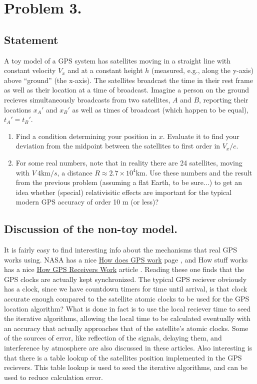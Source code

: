 \section{Problem 3.}
\subsection{Statement}

A toy model of a GPS system has satellites moving in a straight line with constant velocity $V_x$ and at a constant height $h$ (measured, e.g., along the y-axis) above ``ground'' (the x-axis).  The satellites broadcast the time in their rest frame as well as their location at a time of broadcast.  Imagine a person on the ground recieves simultaneously broadcasts from two satellites, $A$ and $B$, reporting their locations $x_A'$ and $x_B'$ as well as times of broadcast (which happen to be equal), $t_A' = t_B'$.	

\begin{enumerate}
\item  Find a condition determining your position in $x$.  Evaluate it to find your deviation from the midpoint between the satellites to first order in $V_x/c$.
\item For some real numbers, note that in reality there are 24 satellites, moving with $V ~4 \text{km}/s$, a distance $R \approx 2.7 \times 10^4 \text{km}$.  Use these numbers and the result from the previous problem (assuming a flat Earth, to be sure...) to get an idea whether (special) relativisitic effects are important for the typical modern GPS accuracy of order 10 m (or less)?
\end{enumerate}

\subsection{Discussion of the non-toy model.}

It is fairly easy to find interesting info about the mechanisms that real GPS works using.  NASA has a nice \href{http://www.nasm.si.edu/gps/work.html}{How does GPS work} page \cite{nasaGPS}, and How stuff works has a nice \href{http://electronics.howstuffworks.com/gadgets/travel/gps.htm}{How GPS Receivers Work} article \cite{howStuffWorksGPS}.  Reading these one finds that the GPS clocks are actually kept synchronized.  The typical GPS reciever obviously has a clock, since we have countdown timers for time until arrival, is that clock accurate enough compared to the satellite atomic clocks to be used for the GPS location algorithm?  What is done in fact is to use the local reciever time to seed the iterative algorithms, allowing the local time to be calculated eventually with an accuracy that actually approaches that of the satellite's atomic clocks.  Some of the sources of error, like reflection of the signals, delaying them, and interference by atmosphere are also discussed in these articles.  Also interesting is that there is a table lookup of the satellites position implemented in the GPS recievers.  This table lookup is used to seed the iterative algorithms, and can be used to reduce calculation error.

